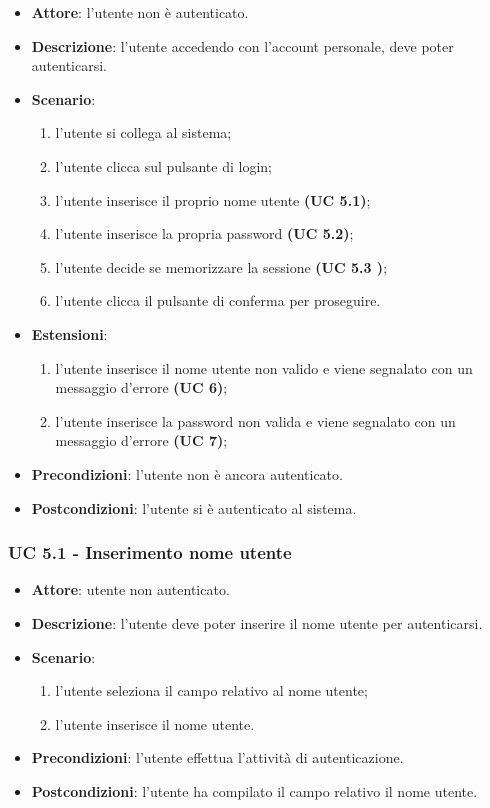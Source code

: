 \begin{itemize}
    \item \textbf{Attore}: l’utente non è autenticato.
    \item \textbf{Descrizione}: l’utente accedendo con l’account personale, deve poter autenticarsi.
    \item \textbf{Scenario}:
    \begin{enumerate}
        \item l’utente si collega al sistema;
        \item l’utente clicca sul pulsante di login;
        \item l’utente inserisce il proprio nome utente \textbf{(UC 5.1)};
        \item l’utente inserisce la propria password \textbf{(UC 5.2)};
        \item l’utente decide se memorizzare la sessione \textbf{(UC 5.3 )};
        \item l’utente clicca il pulsante di conferma per proseguire.
    \end{enumerate}
    \item \textbf{Estensioni}:
        \begin{enumerate}
            \item l’utente inserisce il nome utente non valido e viene segnalato con un messaggio d’errore \textbf{(UC 6)};
            \item l’utente inserisce la password non valida e viene segnalato con un messaggio d’errore \textbf{(UC 7)};
        \end{enumerate}

    \item \textbf{Precondizioni}: l’utente non è ancora autenticato.
    \item \textbf{Postcondizioni}: l’utente si è autenticato al sistema.
\end{itemize}

\subsubsection{UC 5.1 - Inserimento nome utente}
\begin{itemize}
    \item \textbf{Attore}: utente non autenticato.
    \item \textbf{Descrizione}: l’utente deve poter inserire il nome utente per autenticarsi.
    \item \textbf{Scenario}:
    \begin{enumerate}
        \item l’utente seleziona il campo relativo al nome utente;
        \item l’utente inserisce il nome utente.
    \end{enumerate}
    \item \textbf{Precondizioni}: l’utente effettua l’attività di autenticazione.
    \item \textbf{Postcondizioni}: l’utente ha compilato il campo relativo il nome utente.
\end{itemize}

